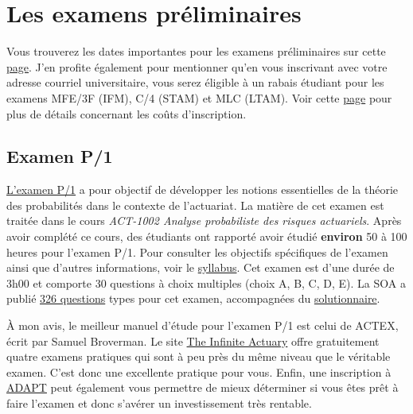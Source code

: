 \section*{Les examens préliminaires}
\label{sec:prelims}
Vous trouverez les dates importantes pour les examens préliminaires sur cette \href{https://www.soa.org/Education/Exam-Req/Exam-Day-Info/edu-2018-cbt-test-schedule.aspx}{page}. J'en profite également pour mentionner qu'en vous inscrivant avec votre adresse courriel universitaire, vous serez éligible à un rabais étudiant pour les examens MFE/3F (IFM), C/4 (STAM) et MLC (LTAM). Voir cette \href{https://soa.org/Education/Exam-Req/Syllabus-Study-Materials/Exam-and-Module-Fees.aspx}{page} pour plus de détails concernant les coûts d'inscription.


\subsection*{Examen P/1}
\label{subsec:examp}
\href{https://www.soa.org/education/exam-req/edu-exam-p-detail.aspx}{L'examen P/1} a pour objectif de développer les notions essentielles de la théorie des probabilités dans le contexte de l'actuariat. La matière de cet examen est traitée dans le cours \textit{ACT-1002 Analyse probabiliste des risques actuariels}. Après avoir complété ce cours, des étudiants ont rapporté avoir étudié \textbf{environ} 50 à 100 heures pour l'examen P/1. Pour consulter les objectifs spécifiques de l'examen ainsi que d'autres informations, voir le \href{https://www.soa.org/Files/Edu/2017/edu-2017-01-p-syllabus.pdf}{syllabus}. Cet examen est d'une durée de 3h00 et comporte 30 questions à choix multiples (choix A, B, C, D, E). La SOA a publié \href{http://www.soa.org/Files/Edu/edu-exam-p-sample-quest.pdf}{326 questions} types pour cet examen, accompagnées du \href{http://www.soa.org/Files/Edu/edu-exam-p-sample-sol.pdf}{solutionnaire}.\vspace{\baselineskip}

À mon avis, le meilleur manuel d'étude pour l'examen P/1 est celui de ACTEX, écrit par Samuel Broverman. Le site \href{http://www.theinfiniteactuary.com/exams/1}{The Infinite Actuary} offre gratuitement quatre examens pratiques qui sont à peu près du même niveau que le véritable examen. C'est donc une excellente pratique pour vous. Enfin, une inscription à \href{https://www.coachingactuaries.com/}{ADAPT} peut également vous permettre de mieux déterminer si vous êtes prêt à faire l'examen et donc s'avérer un investissement très rentable.\vspace{\baselineskip}

